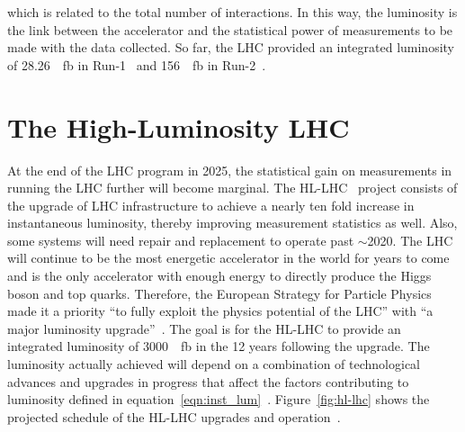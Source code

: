 which is related to the total number of interactions. In this way, the luminosity is the link between the accelerator and the statistical power of measurements to be made with the data collected. So far, the LHC provided an integrated luminosity of \SI{28.26}{\per\femto\barn} in Run-1~\cite{atlas_luminosity_run1} and \SI{156}{\per\femto\barn} in Run-2~\cite{atlas_luminosity_run2}.

\section{The High-Luminosity LHC}
At the end of the LHC program in 2025, the statistical gain on measurements in running the LHC further will become marginal. The HL-LHC~\cite{hl_lhc_tdr} project consists of the upgrade of LHC infrastructure to achieve a nearly ten fold increase in instantaneous luminosity, thereby improving measurement statistics as well. Also, some systems will need repair and replacement to operate past $\sim$2020. The LHC will continue to be the most energetic accelerator in the world for years to come and is the only accelerator with enough energy to directly produce the Higgs boson and top quarks. Therefore, the European Strategy for Particle Physics made it a priority ``to fully exploit the physics potential of the LHC'' with ``a major luminosity upgrade''~\cite{european_strategy_for_particle_physics}. The goal is for the HL-LHC to provide an integrated luminosity of \SI{3000}{\per\femto\barn} in the 12 years following the upgrade. The luminosity actually achieved will depend on a combination of technological advances and upgrades in progress that affect the factors contributing to luminosity defined in equation~\ref{eqn:inst_lum}~\cite{hl_lhc_tdr}. Figure~\ref{fig:hl-lhc} shows the projected schedule of the HL-LHC upgrades and operation~\cite{hl-lhc_plan_picture_website}.

